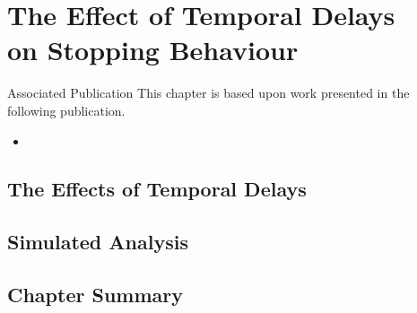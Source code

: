 
\chapter[The Effect of Temporal Delays on Stopping Behaviour]{The Effect of Temporal Delays\\on Stopping Behaviour}\label{chap:temporal}

\begin{publications_box}{Associated Publication}
This chapter is based upon work presented in the following publication.
\vspace*{-3mm}
\begin{itemize}
    \item{}
\end{itemize}
\end{publications_box}

\section{The Effects of Temporal Delays}

\section{Simulated Analysis}

\section{Chapter Summary}